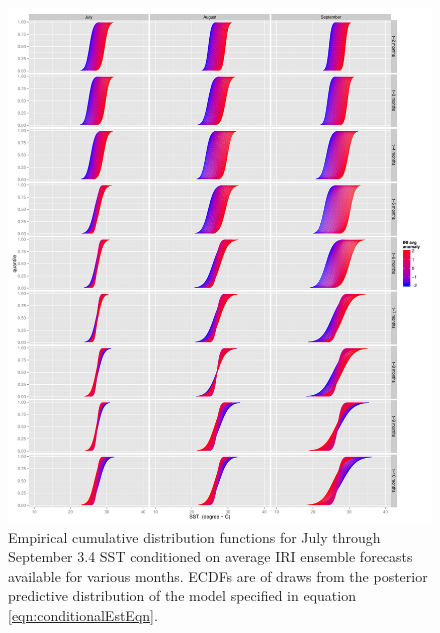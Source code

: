 \documentclass[article]{jss}
\begin{document}
\begin{figure}[!htbp]
  \begin{center}
    \includegraphics[width=\linewidth, keepaspectratio]{img/conditionalCDFs07to09TraditionalCDFconfig.pdf}
    \caption{Empirical cumulative distribution functions for July through September  3.4 SST conditioned on average IRI ensemble forecasts available for various months. ECDFs are of draws from the posterior predictive distribution of the model specified in equation \ref{eqn:conditionalEstEqn}.}
    \label{fig:conditionalCDFs07to09}
   \end{center}
\end{figure}
\end{document}
